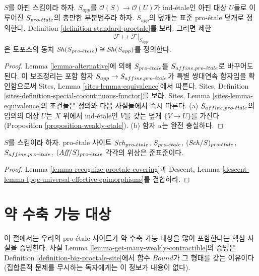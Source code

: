 \begin{lemma}
\label{lemma-affine-alternative}
$S$를 아핀 스킴이라 하자. $S_{app}$를 $\mathcal{O}(S) \to
\mathcal{O}(U)$가 ind-\'etale인 아핀 대상 $U$들로 이루어진
$S_{pro\text{-}\acute{e}tale}$의 충만한 부분범주라 하자. $S_{app}$의 덮개는 표준
pro-\'etale 덮개로 정의한다. Definition
\ref{definition-standard-proetale}를 보라. 그러면 제한
$$
\mathcal{F} \longmapsto \mathcal{F}|_{S_{app}}
$$
은 토포스의 동치 $\mathop{\mathit{Sh}}\nolimits(S_{pro\text{-}\acute{e}tale}) \cong \mathop{\mathit{Sh}}\nolimits(S_{app})$를 정의한다.
\end{lemma}

\begin{proof}
Lemma \ref{lemma-alternative}에 의해 $S_{pro\text{-}\acute{e}tale}$를
$S_{affine, {pro\text{-}\acute{e}tale}}$로 바꾸어도 된다.
이 보조정리는 포함 함자 $S_{app} \to S_{affine, {pro\text{-}\acute{e}tale}}$가 특별
쌍대연속 함자임을 확인함으로써 Sites, Lemma
\ref{sites-lemma-equivalence}에서 따른다. Sites, Definition
\ref{sites-definition-special-cocontinuous-functor}를 보라.
Sites, Lemma \ref{sites-lemma-equivalence}의 조건들은 정의와 다음
사실들에서 즉시 따른다.
(a) $S_{affine, {pro\text{-}\acute{e}tale}}$의 임의의 대상 $U$는 $X$ 위에서
ind-\'etale인 $V$를 갖는 덮개 $\{V \to U\}$를 가진다
(Proposition \ref{proposition-weakly-etale}).
(b) 함자 $u$는 완전 충실하다.
\end{proof}

\begin{lemma}
\label{lemma-proetale-subcanonical}
$S$를 스킴이라 하자. pro-\'etale 사이트
$\mathit{Sch}_{pro\text{-}\acute{e}tale}$, $S_{pro\text{-}\acute{e}tale}$, $(\mathit{Sch}/S)_{pro\text{-}\acute{e}tale}$,
$S_{affine, {pro\text{-}\acute{e}tale}}$, $(\textit{Aff}/S)_{pro\text{-}\acute{e}tale}$ 각각의 위상은
준표준이다.
\end{lemma}

\begin{proof}
Lemma \ref{lemma-recognize-proetale-covering}과 Descent, Lemma
\ref{descent-lemma-fpqc-universal-effective-epimorphisms}를 결합하라.
\end{proof}






\section{약 수축 가능 대상}
\label{section-weakly-contractible}

\noindent
이 절에서는 우리의 pro-\'etale 사이트가 약 수축 가능 대상을 많이
포함한다는 핵심 사실을 증명한다. 사실 Lemma
\ref{lemma-get-many-weakly-contractible}의 증명은 Definition
\ref{definition-big-proetale-site}에서 함수 $Bound$가 그 형태를 갖는
이유이다(집합론적 문제를 무시하는 독자에게는 이 정보가 내용이 없다).


